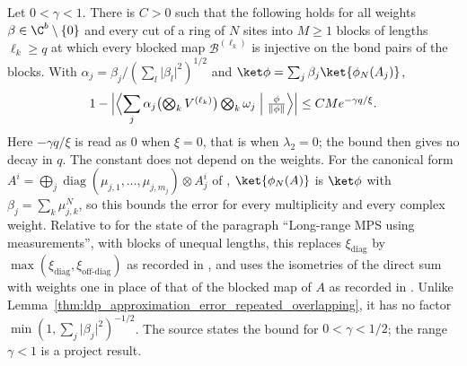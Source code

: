\begin{lemma}
    \label{thm:ldp_overlapping_unequal_blocks_error}
    \leanok
    Let $0<\gamma<1$. There is $C>0$ such that the following holds for all
    weights $\beta\in\C^b\setminus\{0\}$ and every cut of a ring of $N$ sites
    into $M\geq1$ blocks of lengths $\ell_k\geq q$ at which every blocked map
    $\mathcal B^{(\ell_k)}$ is injective on the bond pairs of the blocks. With
    $\alpha_j=\beta_j/(\sum_l\lvert\beta_l\rvert^2)^{1/2}$ and
    $\ket\phi=\sum_j\beta_j\ket{\phi_N(A_j)}$,
    \begin{align*}
        1-\Bigl\lvert\Bigl\langle\sum_j\alpha_j\bigl(\textstyle\bigotimes_kV^{(\ell_k)}\bigr)
        \textstyle\bigotimes_k\omega_j\Bigm|\frac{\phi}{\lVert\phi\rVert}\Bigr\rangle\Bigr\rvert
        \leq CMe^{-\gamma q/\xi}.
    \end{align*}
    Here $-\gamma q/\xi$ is read as $0$ when $\xi=0$, that is when
    $\lambda_2=0$; the bound then gives no decay in $q$. The constant does not
    depend on the weights. For the canonical form
    $A^i=\bigoplus_j\operatorname{diag}(\mu_{j,1},\dots,\mu_{j,m_j})\otimes A_j^i$
    of \cite[eq.~(S2)]{Malz2024Preparation}, $\ket{\phi_N(A)}$ is $\ket\phi$
    with $\beta_j=\sum_k\mu_{j,k}^N$, so this bounds the error for every
    multiplicity and every complex weight. Relative to
    \cite[Lemma~1$'$(ii)]{Malz2024Preparation} for the state of the paragraph
    ``Long-range MPS using measurements'', with blocks of unequal lengths, this
    replaces $\xi_{\mathrm{diag}}$ by
    $\max(\xi_{\mathrm{diag}},\xi_{\mathrm{off\text{-}diag}})$ as recorded in
    \cite{gap:mswc24_block_form_mixed_overlap}, and uses the isometries of the
    direct sum with weights one in place of that of the blocked map of $A$ as
    recorded in \cite{gap:mswc24_measurement_preparation_scope}. Unlike
    Lemma~\ref{thm:ldp_approximation_error_repeated_overlapping}, it has no
    factor $\min(1,\sum_j\lvert\beta_j\rvert^2)^{-1/2}$.
    The source states the bound for $0<\gamma<1/2$; the range $\gamma<1$ is a
    project result.
\end{lemma}
